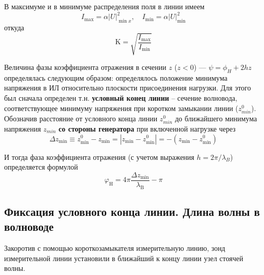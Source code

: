 \documentclass[a4paper,12pt]{article}
\begin{document}
В максимуме и в минимуме распределения поля в линии имеем
\begin{equation}
	I _ { \max } = \alpha | U | _ { \min x } ^ { 2 } , \quad I _ { \min } = \alpha | U | _ { \min } ^ { 2 }
\end{equation}
откуда
\begin{equation}
	\mathrm { K } = \sqrt { \frac { I _ { \mathrm { max } } } { I _ { \mathrm { min } } } }
\end{equation}

Величина фазы коэффициента отражения в сечении $z$ ($z<0$) --- $\psi=\phi_H+2hz$ определялась следующим образом: определялось положение минимума напряжения в ИЛ
 относительно плоскости присоединения нагрузки. Для этого был сначала определен т.н. \textbf{условный конец линии} -- сечение волновода, соответствующее минимуму напряжения при коротком замыкании линии ($z^0_{min}$).
Обозначив расстояние от условного конца линии $z^0_{min}$ до ближайшего минимума напряжения $z_{min}$ \textbf{со стороны генератора} при включенной нагрузке через 
\begin{equation}
	\Delta z _ { \min } \equiv z _ { \min } ^ { 0 } - z _ { \min } = \left| z _ { \min } - z _ { \min } ^ { 0 } \right| =- \left( z _ { \min } - z _ { \min } ^ { 0 } \right)
\end{equation}

И тогда фаза коэффициента отражения (с учетом выражения $h=2\pi/\lambda_B$) определяется формулой
\begin{equation}
	\varphi _ { \mathrm { H } } = 4 \pi \frac { \Delta z _ { \mathrm { min } } } { \lambda _ { \mathrm { B } } } - \pi
\end{equation}

\subsection{Фиксация условного конца линии. Длина волны в волноводе}

Закоротив с помощью короткозамыкателя измерительную линию, зонд измерительной линии установили в ближайший к концу линии узел стоячей волны. 
\end{document}
